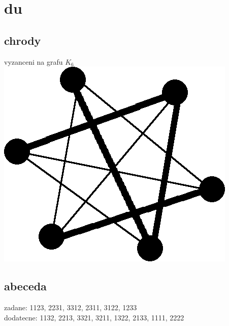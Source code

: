 \documentclass[a4paper]{article}
\begin{document}
\pagestyle{fancy}

\setcounter{section}{3}
\section{du}
\subsection{chrody}
vyzanceni na grafu $K_6$\\
\includegraphics[width=.3\textwidth]{chords.png}

\subsection{}


\subsection{abeceda}
zadane:     1123, 2231, 3312, 2311, 3122, 1233\\
dodatecne:  1132, 2213, 3321, 3211, 1322, 2133, 1111, 2222
\end{document}
